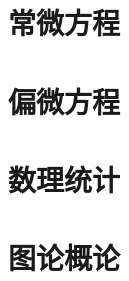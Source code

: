 \documentclass[12pt,oneside,a4paper]{book}
\begin{document}


\part{\kaishu 常微方程}



\part{\kaishu 偏微方程}



\part{\kaishu 数理统计}



\part{\kaishu 图论概论}


\end{document}
